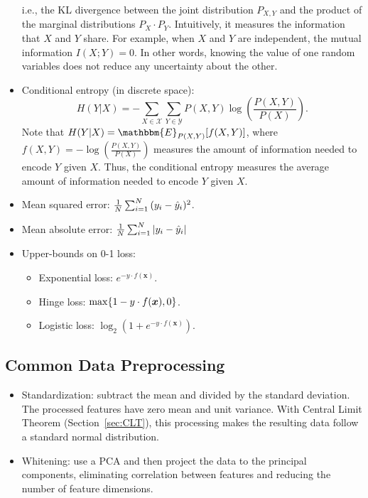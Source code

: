 \begin{itemize}
\begin{equation*}
            \end{equation*}
        i.e., the KL divergence between the joint distribution $P_{X, Y}$ and the product of the marginal distributions $P_X \cdot P_Y$.
        Intuitively, it measures the information that $X$ and $Y$ share. 
        For example, when $X$ and $Y$ are independent, the mutual information $I(X; Y)=0$. In other words, knowing the value of one  random variables does not reduce any uncertainty about the other.
        \item Conditional entropy (in discrete space):
            \begin{equation*}
                H(Y|X) = - \sum_{X \in \mathcal{X}}^{}{
                    \sum_{Y \in \mathcal{Y}}^{}{
                        P(X, Y) \log\left(\frac{P(X, Y)}{P(X)}\right)
                    }
                }.
            \end{equation*}
        Note that $H(Y|X) = \mathbbm{E}_{P(X, Y)}[f(X, Y)]$, where $f(X, Y)=-\log\left(\frac{P(X, Y)}{P(X)}\right)$ measures the amount of information needed to encode $Y$ given $X$.
        Thus, the conditional entropy measures the average amount of information needed to encode $Y$ given $X$.
        \item Mean squared error: $\frac{1}{N}\sum_{i=1}^{N}{(y_i - \hat{y}_i)^2}$.
        \item Mean absolute error: $\frac{1}{N}\sum_{i=1}^{N}{| y_i - \hat{y}_i |}$
        \item Upper-bounds on 0-1 loss:
            \begin{itemize}
                \item Exponential loss: $e^{-y \cdot f(\bm{x})}$.
                \item Hinge loss: $\max\{ 1 - y \cdot f(\bm{x}), 0 \}$.
                \item Logistic loss: $\log_2\left( 1 + e^{-y \cdot f(\bm{x})}\right)$. 
            \end{itemize}
    \end{itemize}
    

\subsection{Common Data Preprocessing}
    \begin{itemize}
        \item Standardization: subtract the mean and divided by the standard deviation. The processed features have zero mean and unit variance. With Central Limit Theorem (Section~\ref{sec:CLT}), this processing makes the resulting data follow a standard normal distribution.
        \item Whitening: use a PCA and then project the data to the principal components, eliminating correlation between features and reducing the number of feature dimensions. 
    \end{itemize}
    


